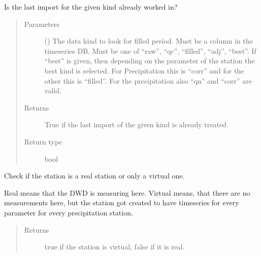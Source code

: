 \documentclass[letterpaper,10pt,english]{sphinxmanual}
\begin{document}
\begin{fulllineitems}
\begin{fulllineitems}
\end{fulllineitems}


\begin{fulllineitems}
\label{\detokenize{weatherDB:weatherDB.station.StationBase.is_last_imp_done}}
\sphinxAtStartPar
Is the last import for the given kind already worked in?
\begin{quote}\begin{description}
\item[{Parameters}] \leavevmode
\sphinxAtStartPar
{} () \textendash{} The data kind to look for filled period.
Must be a column in the timeseries DB.
Must be one of “raw”, “qc”, “filled”, “adj”, “best”.
If “best” is given, then depending on the parameter of the station the best kind is selected.
For Precipitation this is “corr” and for the other this is “filled”.
For the precipitation also “qn” and “corr” are valid.

\item[{Returns}] \leavevmode
\sphinxAtStartPar
True if the last import of the given kind is already treated.

\item[{Return type}] \leavevmode
\sphinxAtStartPar
bool

\end{description}\end{quote}

\end{fulllineitems}


\begin{fulllineitems}
\label{\detokenize{weatherDB:weatherDB.station.StationBase.is_virtual}}
\sphinxAtStartPar
Check if the station is a real station or only a virtual one.

\sphinxAtStartPar
Real means that the DWD is measuring here.
Virtual means, that there are no measurements here, but the station got created to have timeseries for every parameter for every precipitation station.
\begin{quote}\begin{description}
\item[{Returns}] \leavevmode
\sphinxAtStartPar
true if the station is virtual, false if it is real.


\end{description}
\end{quote}
\end{fulllineitems}
\end{fulllineitems}
\end{document}
